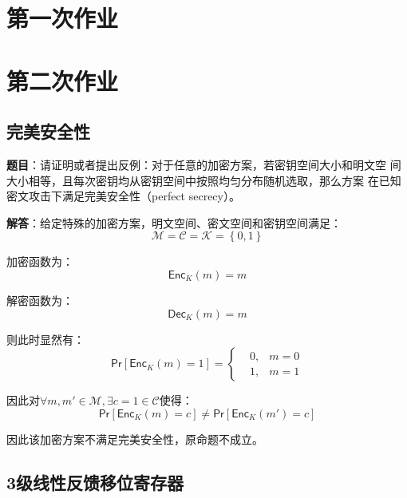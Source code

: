 \chapter{第一次作业}

\newpage
\chapter{第二次作业}

\section{完美安全性}

\textbf{题目}：请证明或者提出反例：对于任意的加密方案，若密钥空间大小和明文空
间大小相等，且每次密钥均从密钥空间中按照均匀分布随机选取，那么方案
在已知密文攻击下满足完美安全性（perfect secrecy）。

\textbf{解答}：给定特殊的加密方案，明文空间、密文空间和密钥空间满足：
\begin{equation}
    \mathcal{M}=\mathcal{C}=\mathcal{K}=\left\{0, 1\right\}
\end{equation}

加密函数为：
\begin{equation}
    \mathsf{Enc}_K(m) = m
\end{equation}

解密函数为：
\begin{equation}
    \mathsf{Dec}_K(m) = m
\end{equation}

则此时显然有：
\begin{equation}
    \mathsf{Pr}\left[\mathsf{Enc}_K(m) = 1\right] = \left\{
        \begin{aligned}
            &0, & m = 0\\
            &1, & m = 1
        \end{aligned}
    \right.
\end{equation}

因此对$\forall m, m' \in \mathcal{M}, \exists c = 1 \in \mathcal{C}$使得：
\begin{equation}
    \mathsf{Pr}\left[\mathsf{Enc}_K(m) = c\right] \neq \mathsf{Pr}\left[\mathsf{Enc}_K(m') = c\right]
\end{equation}

因此该加密方案不满足完美安全性，原命题不成立。

\section{3级线性反馈移位寄存器}

